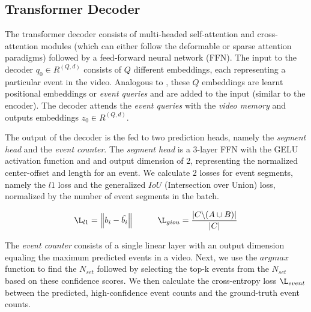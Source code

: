 \subsection{Transformer Decoder}
The transformer decoder consists of multi-headed self-attention and cross-attention modules (which can either follow the deformable or sparse attention paradigms) followed by a feed-forward neural network (FFN). The input to the decoder $q_{0} \in R^{(Q , d)}$ consists of $Q$ different embeddings, each representing a particular event in the video. Analogous to \cite{carion2020detr}, these $Q$ embeddings are learnt positional embeddings or \textit{event queries} and are added to the input (similar to the encoder). The decoder attends the \textit{event queries} with the \textit{video memory} and outputs embeddings $z_{0} \in R^{(Q , d)}$.
\par The output of the decoder is the fed to two prediction heads, namely the \textit{segment head} and the \textit{event counter}. The \textit{segment head} is a 3-layer FFN with the GELU activation function and and output dimension of 2, representing the normalized center-offset and length for an event. We calculate 2 losses for event segments, namely the $l1$ loss and the generalized $IoU$ (Intersection over Union) loss, normalized by the number of event segments in the batch.

$$\L_{l1} =  \left \| b_{i} - \hat{b_{i}} \right \| \hspace{1cm} \L_{giou} = \frac{\left |C\symbol{92}(A\cup B)   \right |}{\left | C \right |} $$

\par The \textit{event counter} consists of a single linear layer with an output dimension equaling the maximum predicted events in a video. Next, we use the $argmax$ function to find the $N_{set}$ followed by selecting the top-k events from the $N_{set}$ based on these confidence scores. We then calculate the cross-entropy loss $\L_{event}$ between the predicted, high-confidence event counts and the ground-truth event counts.

